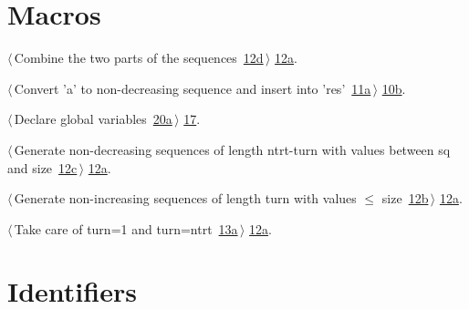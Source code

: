 \documentclass[reqno]{amsart}
\renewcommand{\NWlink}[2]{\hyperlink{#1}{#2}}
\begin{document}
\section{Macros}


{\small\begin{list}{}{\setlength{\itemsep}{-\parsep}\setlength{\itemindent}{-\leftmargin}}
\item $\langle\,$Combine the two parts of the sequences\nobreak\ {\footnotesize \NWlink{nuweb12d}{12d}}$\,\rangle$ {\footnotesize {\NWtxtRefIn} \NWlink{nuweb12a}{12a}.}
\item $\langle\,$Convert 'a' to non-decreasing sequence and insert into 'res'\nobreak\ {\footnotesize \NWlink{nuweb11a}{11a}}$\,\rangle$ {\footnotesize {\NWtxtRefIn} \NWlink{nuweb10b}{10b}.}
\item $\langle\,$Declare global variables\nobreak\ {\footnotesize \NWlink{nuweb20a}{20a}}$\,\rangle$ {\footnotesize {\NWtxtRefIn} \NWlink{nuweb17}{17}.}
\item $\langle\,$Generate non-decreasing sequences of length ntrt-turn with values between sq and size\nobreak\ {\footnotesize \NWlink{nuweb12c}{12c}}$\,\rangle$ {\footnotesize {\NWtxtRefIn} \NWlink{nuweb12a}{12a}.}
\item $\langle\,$Generate non-increasing sequences of length turn with values $\leq$ size\nobreak\ {\footnotesize \NWlink{nuweb12b}{12b}}$\,\rangle$ {\footnotesize {\NWtxtRefIn} \NWlink{nuweb12a}{12a}.}
\item $\langle\,$Take care of turn=1 and turn=ntrt\nobreak\ {\footnotesize \NWlink{nuweb13a}{13a}}$\,\rangle$ {\footnotesize {\NWtxtRefIn} \NWlink{nuweb12a}{12a}.}
\end{list}}

\section{Identifiers}
\end{document}
